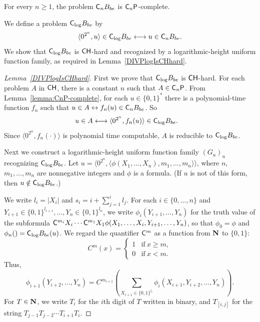 \begin{lemma} \label{lemma:CnP-complete}
 For every $n \ge 1$, 
 the problem $\mathsf{C}_n B_{be}$ is $\mathsf{C}_n\mathsf{P}$-complete.
\end{lemma}

We define a problem $\mathsf{C}_{\log} B_{be}$ by
\begin{equation}
 \langle 0^{2^n}, u \rangle \in \mathsf{C}_{\log} B_{be}
 \longleftrightarrow
 u \in \mathsf{C}_n B_{be}.
\end{equation}
We show that $\mathsf{C}_{\log} B_{be}$ 
is $\mathsf{CH}$-hard and recognized by a logarithmic-height uniform function family,
as required in Lemma~\ref{DIVPlogIsCHhard}. 

\begin{proof}[Lemma~\ref{DIVPlogIsCHhard}]
First we prove that $\mathsf{C}_{\log} B_{be}$ is $\mathsf{CH}$-hard.
For each problem $A$ in $\mathsf{CH}$, there is a constant $n$ such that $A \in \mathsf{C}_n \mathsf{P}$.
From Lemma~\ref{lemma:CnP-complete}, for each $u \in \{0,1\}^*$
there is a polynomial-time function $f_n$ such that
$u \in A \leftrightarrow f_n(u) \in \mathsf{C}_n B_{be}$. So
\begin{align}
 u \in A 
 & \longleftrightarrow \langle 0^{2^n}, f_n(u) \rangle \in \mathsf{C}_{\log} B_{be}.
\end{align}
Since $\langle 0^{2^n}, f_n(\cdot) \rangle$ is polynomial time computable,
$A$ is reducible to $\mathsf{C}_{\log} B_{be}$.


Next we construct a logarithmic-height uniform function family $(G_u)_u$
recognizing $\mathsf{C}_{\log} B_{be}$.
Let $u  = \langle 0^{2^n}, 
\langle \phi(X_1, \dots, X_n), m_1, \dots, m_n \rangle \rangle$, 
where $n$, $m_1, \dots, m_n$ are nonnegative integers 
and $\phi$ is a formula. 
(If $u$ is not of this form, then $u \notin \mathsf{C}_{\log} B_{be}$.)
 
We write $l_i = |X_i|$ and $s_i = i + \sum^i_{j=1}l_j$.
For each $i \in \{0, \dots, n\}$ and
$Y_{i+1} \in \{0,1\}^{l_{i+1}}, \dots, Y_n \in \{0,1\}^{l_n}$,
we write $\phi_i(Y_{i+1}, \dots, Y_n)$ for the truth value of the subformula
$\mathsf{C}^{m_{i}}{X_i} \cdots \mathsf{C}^{m_1}{X_1} \phi(X_1, \dots, X_i, Y_{i+1}, \dots, Y_n)$,
so that $\phi_0 = \phi$ and $\phi_n() = \mathsf{C}_{\log} B_{be} (u)$.
We regard the quantifier $\mathsf{C}^m$ as a function from $\mathbf N$ to $\{0,1\}$:
\begin{equation}
 C^m(x) 
  = \begin{cases}
     1 & \text{if} \ x \ge m, \\
     0 & \text{if} \ x < m.
    \end{cases}
\end{equation}
Thus,
\begin{equation} \label{eq:phi-step}
 \phi_{i+1}(Y_{i+2}, \dots, Y_n) 
  = C^{m_{i+1}}\left(\sum_{X_{i+1} \in \{ 0,1 \} ^{l_i}}
		\phi_i(X_{i+1}, Y_{i+2}, \dots, Y_{n})\right).
\end{equation}
For $T \in \mathbf N$, we write $T_i$ for the $i$th digit of $T$ written in binary,
and $T_{[i,j]}$ for the string $T_{j-1} T_{j-2} \cdots T_{i+1} T_{i}$.


\end{proof}
